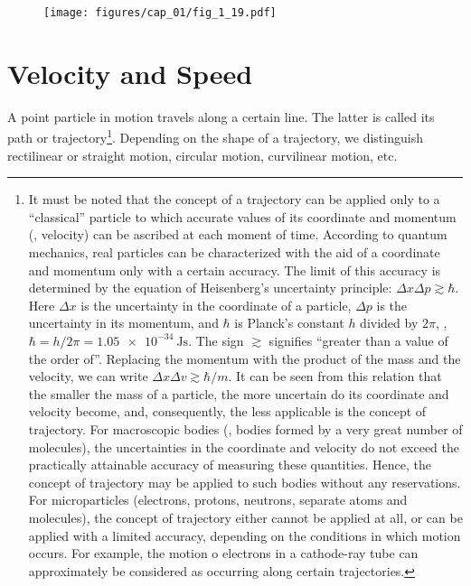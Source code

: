 \begin{figure}[t]
	\begin{center}
		\texttt{[image: figures/cap\_01/fig\_1\_19.pdf]}
		\caption[]{}
		\label{fig:1_19}
	\end{center}
	\vspace{-0.7cm}
\end{figure}

\section{Velocity and Speed}\label{sec:1_3}

A point particle in motion travels along a certain line. The latter is called its path or trajectory\footnote{It must be noted that the concept of a trajectory can be applied only to a ``classical'' particle to which accurate values of its coordinate and momentum (\ie, velocity) can be ascribed at each moment of time. According to quantum mechanics, real particles can be characterized with the aid of a coordinate and momentum only with a certain accuracy. The limit of this accuracy is determined by the equation of Heisenberg's uncertainty principle: $\Delta x\Delta p\gtrsim\hbar$. Here $\Delta x$ is the uncertainty in the coordinate of a particle, $\Delta p$ is the uncertainty in its momentum, and $\hbar$ is Planck's constant $h$ divided by $2\pi$, \ie, $\hbar = h/2\pi = \SI{1.05e-34}{\joule\second}$. The sign $\gtrsim$ signifies ``greater than a value of the order of''. Replacing the momentum with the product of the mass and the velocity, we can write $\Delta x\Delta v\gtrsim\hbar/m$. It can be seen from this relation that the smaller the mass of a particle, the more uncertain do its coordinate and velocity become, and, consequently, the less applicable is the concept of trajectory. For macroscopic bodies (\ie, bodies formed by a very great number of molecules), the uncertainties in the coordinate and velocity do not exceed the practically attainable accuracy of measuring these quantities. Hence, the concept of trajectory may be applied to such bodies without any reservations. For microparticles (electrons, protons, neutrons, separate atoms and molecules), the concept of trajectory either cannot be applied at all, or can be applied with a limited accuracy, depending on the conditions in which motion occurs. For example, the motion o electrons in a cathode-ray tube can approximately be considered as occurring along certain trajectories.}. Depending on the shape of a trajectory, we distinguish rectilinear or straight motion, circular motion, curvilinear motion, etc.


